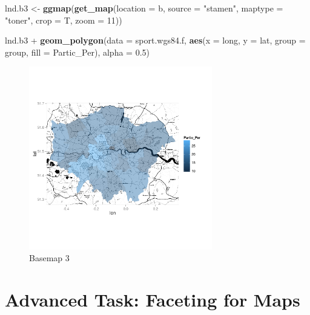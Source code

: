 \documentclass[]{article}
\newenvironment{Shaded}{}{}
\newcommand{\KeywordTok}[1]{\textcolor[rgb]{0.00,0.44,0.13}{\textbf{{#1}}}}
\newcommand{\DataTypeTok}[1]{\textcolor[rgb]{0.56,0.13,0.00}{{#1}}}
\newcommand{\DecValTok}[1]{\textcolor[rgb]{0.25,0.63,0.44}{{#1}}}
\newcommand{\FloatTok}[1]{\textcolor[rgb]{0.25,0.63,0.44}{{#1}}}
\newcommand{\StringTok}[1]{\textcolor[rgb]{0.25,0.44,0.63}{{#1}}}
\newcommand{\NormalTok}[1]{{#1}}
\let\Oldincludegraphics\includegraphics
\renewcommand{\includegraphics}[1]{\Oldincludegraphics[width=8cm]{#1}}
\begin{document}
\begin{Shaded}
\begin{Highlighting}[]
\NormalTok{lnd.b3 <- }\KeywordTok{ggmap}\NormalTok{(}\KeywordTok{get_map}\NormalTok{(}\DataTypeTok{location =} \NormalTok{b, }\DataTypeTok{source =} \StringTok{"stamen"}\NormalTok{, }\DataTypeTok{maptype =} \StringTok{"toner"}\NormalTok{, }
    \DataTypeTok{crop =} \NormalTok{T, }\DataTypeTok{zoom =} \DecValTok{11}\NormalTok{))}

\NormalTok{lnd.b3 + }\KeywordTok{geom_polygon}\NormalTok{(}\DataTypeTok{data =} \NormalTok{sport.wgs84.f, }\KeywordTok{aes}\NormalTok{(}\DataTypeTok{x =} \NormalTok{long, }\DataTypeTok{y =} \NormalTok{lat, }\DataTypeTok{group =} \NormalTok{group, }
    \DataTypeTok{fill =} \NormalTok{Partic_Per), }\DataTypeTok{alpha =} \FloatTok{0.5}\NormalTok{)}
\end{Highlighting}
\end{Shaded}
\begin{figure}[htbp]
\centering
\includegraphics{figure/Basemap_3.png}
\caption{Basemap 3}
\end{figure}

\section{Advanced Task: Faceting for Maps}
\end{document}
